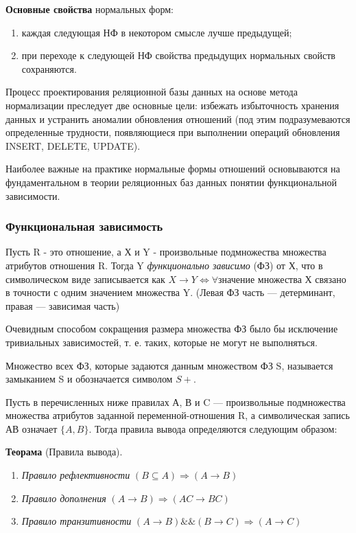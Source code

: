 \textbf{Основные свойства} нормальных форм:

\begin{enumerate}
	\item каждая следующая НФ в некотором смысле лучше предыдущей;
	\item при переходе к следующей НФ свойства предыдущих нормальных свойств сохраняются. 
\end{enumerate}

Процесс проектирования реляционной базы данных на основе метода нормализации преследует две основные цели: избежать избыточность хранения данных и устранить аномалии обновления отношений (под этим подразумеваются определенные трудности, появляющиеся при выполнении операций обновления INSERT, DELETE, UPDATE).

Наиболее важные на практике нормальные формы отношений основываются на фундаментальном в теории
реляционных баз данных понятии функциональной зависимости.

\subsubsection{Функциональная зависимость}

Пусть R - это отношение, а Х и Y - произвольные подмножества множества атрибутов отношения R. Тогда Y
\textit{функционально зависимо} (ФЗ) от Х, что в символическом виде записывается как $X \to Y \Leftrightarrow \forall$значение множества Х связано в точности с одним значением множества Y. (Левая ФЗ часть --- детерминант, правая --- зависимая часть)

Очевидным способом сокращения размера множества ФЗ было бы исключение тривиальных зависимостей, т. е. таких, которые не могут не выполняться.

Множество всех ФЗ, которые задаются данным множеством ФЗ S, называется замыканием S и обозначается символом $S+$.

Пусть в перечисленных ниже правилах А, В и C — произвольные подмножества множества атрибутов заданной переменной-отношения R, а символическая запись АВ означает $\{A, B\}$. Тогда правила
вывода определяются следующим образом:

\textbf{Теорама} (Правила вывода).
\begin{enumerate}
	\item \textit{Правило рефлективности} $(B \subseteq A) \Rightarrow (A \to B)$
	\item \textit{Правило дополнения} $(A \to B) \Rightarrow (AC \to BC)$
	\item \textit{Правило транзитивности} $(A \to B) \&\& (B \to C) \Rightarrow (A \to C)$
\end{enumerate}

